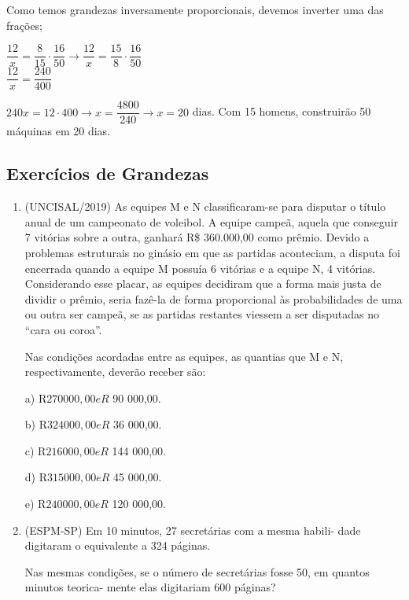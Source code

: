 \begin{multicols*}{2}
    Como temos grandezas inversamente proporcionais, devemos inverter uma das frações;

    $ \dfrac{12}{x} = \dfrac{8}{15} \cdot \dfrac{16}{50} \to \dfrac{12}{x} = \dfrac{15}{8} \cdot \dfrac{16}{50}  $\\

    $ \dfrac{12}{x} = \dfrac{240}{400}$

    $ 240x = 12 \cdot 400 \to x = \dfrac{4800}{240} \to x = 20 $ dias. Com 15 homens, construirão 50 máquinas em 20 dias.

    \subsection{Exercícios de Grandezas}

    \begin{enumerate}

        \item (UNCISAL/2019) As equipes M e N classificaram-se para disputar o título anual de um campeonato de voleibol. A equipe campeã, aquela que conseguir 7 vitórias sobre a outra, ganhará R\$ 360.000,00 como prêmio. Devido a problemas estruturais no ginásio em que as partidas aconteciam, a disputa foi encerrada quando a equipe M possuía 6 vitórias e a equipe N, 4 vitórias. Considerando esse placar, as equipes decidiram que a forma mais justa de dividir o prêmio, seria fazê-la de forma proporcional às probabilidades de uma ou outra ser campeã, se as partidas restantes viessem a ser disputadas no “cara ou coroa”.

              Nas condições acordadas entre as equipes, as quantias que M e N, respectivamente, deverão receber são:

              a)	  R$ 270 000,00 e R$ 90 000,00.

              b)	  R$ 324 000,00 e R$ 36 000,00.

              c)	  R$ 216 000,00 e R$ 144 000,00.

              d)	  R$ 315 000,00 e R$ 45 000,00.

              e)	  R$ 240 000,00 e R$ 120 000,00.

        \item (ESPM-SP) Em 10 minutos, 27 secretárias com a mesma habili- dade digitaram o equivalente a 324 páginas.

              Nas mesmas condições, se o número de secretárias fosse 50, em quantos minutos teorica- mente elas digitariam 600 páginas?


\end{enumerate}
\end{multicols*}
